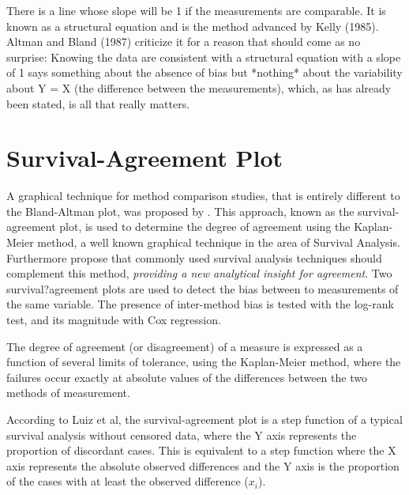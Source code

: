 \documentclass[12pt, a4paper]{report}
\theoremstyle{plain}
\theoremstyle{definition}
\theoremstyle{remark}
\begin{document}
 There is a line whose slope will be 1 if the measurements are comparable. It is known as a structural equation and is the method advanced by Kelly (1985). Altman and Bland (1987) criticize it for a reason that should come as no surprise: Knowing the data are consistent with a structural equation with a slope of 1 says something about the absence of bias but *nothing* about the variability about Y = X (the difference between the measurements), which, as has already been stated, is all that really matters.




	

	\section{Survival-Agreement Plot}
	A graphical technique for method comparison studies, that is entirely different to the Bland-Altman plot, was proposed by \citet{luiz}. This approach, known as the survival-agreement plot, is used to determine the degree of agreement using the Kaplan-Meier method, a well known graphical technique in the area of Survival Analysis. Furthermore \citet{luiz} propose that commonly used survival analysis techniques should complement this method,\textit{ providing a new analytical insight
		for agreement}. Two survival?agreement plots are used to detect the bias between to measurements of the same variable. The presence of inter-method bias is tested with the log-rank test, and its magnitude with Cox regression.
	
	
	The degree of agreement (or disagreement) of a measure is expressed as a function of several limits of tolerance, using the Kaplan-Meier method, where the failures occur exactly at absolute values of the differences between the two methods of measurement. 
	
	According to Luiz et al, the survival-agreement plot is a step function of a typical survival analysis without censored data, where the Y axis represents the proportion of discordant cases. This is equivalent to a step function where the X axis represents the absolute  observed differences and the Y axis is the proportion of the cases with at least the observed 
	difference ($x_i$). 
	
\end{document}
